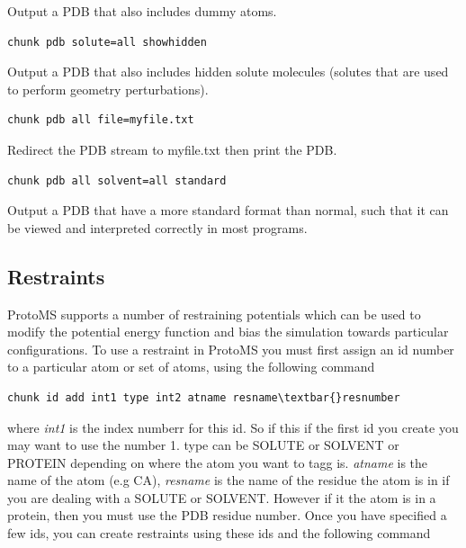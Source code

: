 \documentclass[letterpaper,10pt,english]{sphinxmanual}
\begin{document}
Output a PDB that also includes dummy atoms.

\begin{Verbatim}[frame=single,commandchars=\\\{\}]
chunk pdb solute=all showhidden
\end{Verbatim}

Output a PDB that also includes hidden solute molecules (solutes that are used to perform geometry perturbations).

\begin{Verbatim}[frame=single,commandchars=\\\{\}]
chunk pdb all file=myfile.txt
\end{Verbatim}

Redirect the PDB stream to myfile.txt then print the PDB.

\begin{Verbatim}[frame=single,commandchars=\\\{\}]
chunk pdb all solvent=all standard
\end{Verbatim}

Output a PDB that have a more standard format than normal, such that it can be viewed and interpreted correctly in most programs.


\subsection{Restraints}
\label{protoms:restraints}\label{protoms:index-71}
ProtoMS supports a number of restraining potentials which can be used to modify the potential energy function and bias the simulation towards particular configurations. To use a restraint in ProtoMS you must first assign an id number to a particular atom or set of atoms, using the following command

\begin{Verbatim}[frame=single,commandchars=\\\{\}]
chunk id add int1 type int2 atname resname\textbar{}resnumber
\end{Verbatim}

where \emph{int1} is the index numberr for this id. So if this if the first id you create you may want to use the number 1. type can be SOLUTE or SOLVENT or PROTEIN depending on where the atom you want to tagg is. \emph{atname} is the name of the atom (e.g CA), \emph{resname} is the name of the residue the atom is in if you are dealing with a SOLUTE or SOLVENT. However if it the atom is in a protein, then you must use the PDB residue number.
Once you have specified a few ids, you can create restraints using these ids and the following command
\end{document}
